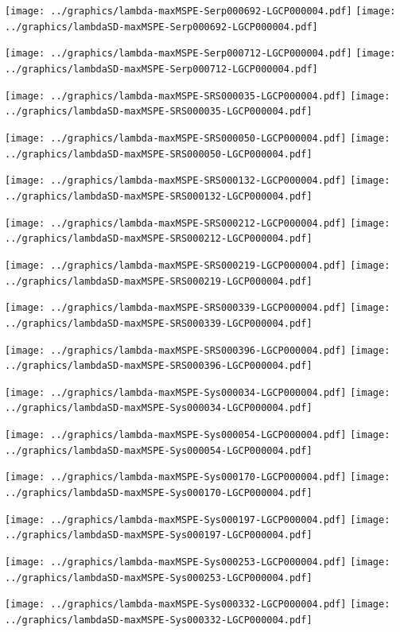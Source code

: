 \documentclass[review]{elsarticle}
\begin{document}
\texttt{[image: ../graphics/lambda-maxMSPE-Serp000692-LGCP000004.pdf]}
\texttt{[image: ../graphics/lambdaSD-maxMSPE-Serp000692-LGCP000004.pdf]}

\texttt{[image: ../graphics/lambda-maxMSPE-Serp000712-LGCP000004.pdf]}
\texttt{[image: ../graphics/lambdaSD-maxMSPE-Serp000712-LGCP000004.pdf]}

\texttt{[image: ../graphics/lambda-maxMSPE-SRS000035-LGCP000004.pdf]}
\texttt{[image: ../graphics/lambdaSD-maxMSPE-SRS000035-LGCP000004.pdf]}

\texttt{[image: ../graphics/lambda-maxMSPE-SRS000050-LGCP000004.pdf]}
\texttt{[image: ../graphics/lambdaSD-maxMSPE-SRS000050-LGCP000004.pdf]}

\texttt{[image: ../graphics/lambda-maxMSPE-SRS000132-LGCP000004.pdf]}
\texttt{[image: ../graphics/lambdaSD-maxMSPE-SRS000132-LGCP000004.pdf]}

\texttt{[image: ../graphics/lambda-maxMSPE-SRS000212-LGCP000004.pdf]}
\texttt{[image: ../graphics/lambdaSD-maxMSPE-SRS000212-LGCP000004.pdf]}

\texttt{[image: ../graphics/lambda-maxMSPE-SRS000219-LGCP000004.pdf]}
\texttt{[image: ../graphics/lambdaSD-maxMSPE-SRS000219-LGCP000004.pdf]}

\texttt{[image: ../graphics/lambda-maxMSPE-SRS000339-LGCP000004.pdf]}
\texttt{[image: ../graphics/lambdaSD-maxMSPE-SRS000339-LGCP000004.pdf]}

\texttt{[image: ../graphics/lambda-maxMSPE-SRS000396-LGCP000004.pdf]}
\texttt{[image: ../graphics/lambdaSD-maxMSPE-SRS000396-LGCP000004.pdf]}

\texttt{[image: ../graphics/lambda-maxMSPE-Sys000034-LGCP000004.pdf]}
\texttt{[image: ../graphics/lambdaSD-maxMSPE-Sys000034-LGCP000004.pdf]}

\texttt{[image: ../graphics/lambda-maxMSPE-Sys000054-LGCP000004.pdf]}
\texttt{[image: ../graphics/lambdaSD-maxMSPE-Sys000054-LGCP000004.pdf]}

\texttt{[image: ../graphics/lambda-maxMSPE-Sys000170-LGCP000004.pdf]}
\texttt{[image: ../graphics/lambdaSD-maxMSPE-Sys000170-LGCP000004.pdf]}

\texttt{[image: ../graphics/lambda-maxMSPE-Sys000197-LGCP000004.pdf]}
\texttt{[image: ../graphics/lambdaSD-maxMSPE-Sys000197-LGCP000004.pdf]}

\texttt{[image: ../graphics/lambda-maxMSPE-Sys000253-LGCP000004.pdf]}
\texttt{[image: ../graphics/lambdaSD-maxMSPE-Sys000253-LGCP000004.pdf]}

\texttt{[image: ../graphics/lambda-maxMSPE-Sys000332-LGCP000004.pdf]}
\texttt{[image: ../graphics/lambdaSD-maxMSPE-Sys000332-LGCP000004.pdf]}
\end{document}
